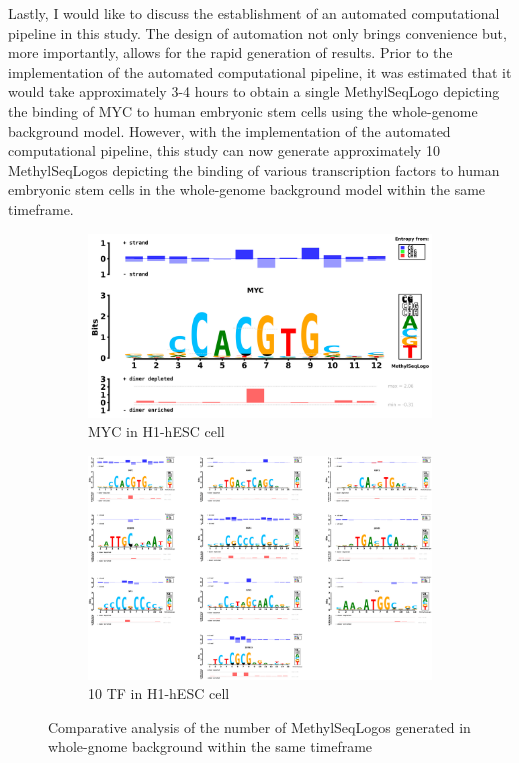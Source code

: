 \documentclass{PHlab-thesis}
\begin{document}
Lastly, I would like to discuss the establishment of an automated computational pipeline in this study. The design of automation not only brings convenience but, more importantly, allows for the rapid generation of results. Prior to the implementation of the automated computational pipeline, it was estimated that it would take approximately 3-4 hours to obtain a single MethylSeqLogo depicting the binding of MYC to human embryonic stem cells using the whole-genome background model. However, with the implementation of the automated computational pipeline, this study can now generate approximately 10 MethylSeqLogos depicting the binding of various transcription factors to human embryonic stem cells in the whole-genome background model within the same timeframe.
\begin{figure}[H]
	\centering
	\begin{subfigure}[b]{0.48\textwidth}
		\includegraphics[width=\textwidth]{figures/yulingMYC_human_H1-hESC_whole_genome_Methyl_Kullback-Liebler_seqlogo copy.png}
		\caption{MYC in H1-hESC cell}
		\label{fig:MYCH1-hESC} 
	\end{subfigure}
	\begin{subfigure}[b]{0.48\textwidth}
		\includegraphics[width=\textwidth]{figures/10.png}
		\caption{10 TF in H1-hESC cell}
		\label{fig:10TF} 
	\end{subfigure}
	\caption{Comparative analysis of the number of MethylSeqLogos generated in whole-gnome background within the same timeframe}
	\label{fig:Comparative} 
\end{figure}
\end{document}
